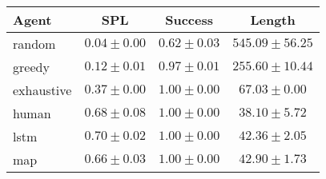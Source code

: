\begin{tabular}{lccc}
    \toprule
    Agent & SPL & Success & Length \\
    \midrule
    random & $0.04 \pm 0.00$ & $0.62 \pm 0.03$ & $545.09 \pm 56.25$\\
    greedy & $0.12 \pm 0.01$ & $0.97 \pm 0.01$ & $255.60 \pm 10.44$\\
    exhaustive & $0.37 \pm 0.00$ & $1.00 \pm 0.00$ & $67.03 \pm 0.00$\\
    human & $0.68 \pm 0.08$ & $1.00 \pm 0.00$ & $38.10 \pm 5.72$\\
    lstm & $0.70 \pm 0.02$ & $1.00 \pm 0.00$ & $42.36 \pm 2.05$\\
    map & $0.66 \pm 0.03$ & $1.00 \pm 0.00$ & $42.90 \pm 1.73$\\
    \bottomrule
\end{tabular}